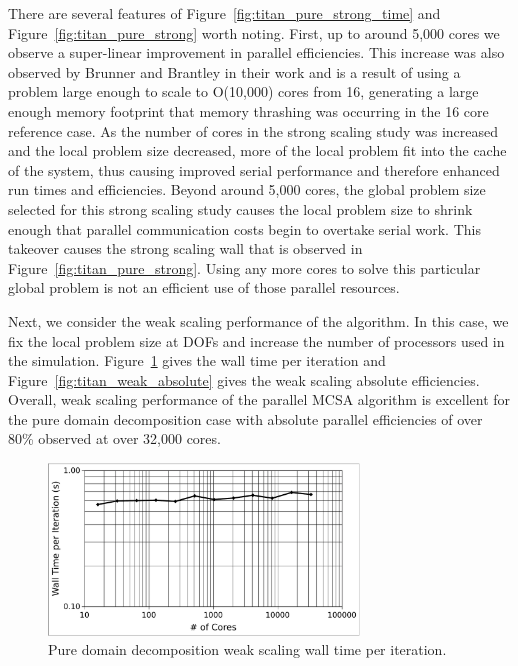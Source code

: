 \documentclass{snamc2013}
\begin{document}
There are several features of Figure~\ref{fig:titan_pure_strong_time}
and Figure~\ref{fig:titan_pure_strong} worth noting. First, up to
around 5,000 cores we observe a super-linear improvement in parallel
efficiencies. This increase was also observed by Brunner and Brantley
in their work and is a result of using a problem large enough to scale
to O(10,000) cores from 16, generating a large enough memory footprint
that memory thrashing was occurring in the 16 core reference case. As
the number of cores in the strong scaling study was increased and the
local problem size decreased, more of the local problem fit into the
cache of the system, thus causing improved serial performance and
therefore enhanced run times and efficiencies. Beyond around 5,000
cores, the global problem size selected for this strong scaling study
causes the local problem size to shrink enough that parallel
communication costs begin to overtake serial work. This takeover
causes the strong scaling wall that is observed in
Figure~\ref{fig:titan_pure_strong}. Using any more cores to solve this
particular global problem is not an efficient use of those parallel
resources.

Next, we consider the weak scaling performance of the algorithm. In
this case, we fix the local problem size at  DOFs and
increase the number of processors used in the
simulation. Figure~\ref{fig:titan_pure_weak_time} gives the wall time
per iteration and Figure~\ref{fig:titan_weak_absolute} gives the weak
scaling absolute efficiencies. Overall, weak scaling performance of
the parallel MCSA algorithm is excellent for the pure domain
decomposition case with absolute parallel efficiencies of over 80\%
observed at over 32,000 cores.

\begin{figure}[h!]
  \begin{center}
    \includegraphics[width=3.25in]{titan_pure_weak_time.pdf}
  \end{center}
  \caption{Pure domain decomposition weak scaling wall time
      per iteration.}
  \label{fig:titan_pure_weak_time}
\end{figure}
\end{document}
